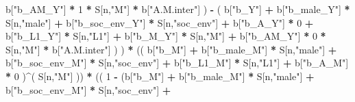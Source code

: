 \documentclass[
]{book}
\newenvironment{Shaded}{\begin{snugshade}}{\end{snugshade}}
\newcommand{\DecValTok}[1]{\textcolor[rgb]{0.00,0.00,0.81}{#1}}
\newcommand{\NormalTok}[1]{#1}
\newcommand{\SpecialCharTok}[1]{\textcolor[rgb]{0.81,0.36,0.00}{\textbf{#1}}}
\newcommand{\StringTok}[1]{\textcolor[rgb]{0.31,0.60,0.02}{#1}}
\begin{document}
\begin{Shaded}
\begin{Highlighting}[]
\NormalTok{                             b[}\StringTok{"b\_AM\_Y"}\NormalTok{] }\SpecialCharTok{*} \DecValTok{1} \SpecialCharTok{*}\NormalTok{ S[n,}\StringTok{"M"}\NormalTok{] }\SpecialCharTok{*}\NormalTok{ b[}\StringTok{"A.M.inter"}\NormalTok{] ) }\SpecialCharTok{{-}} 
\NormalTok{                           ( b[}\StringTok{"b\_Y"}\NormalTok{] }\SpecialCharTok{+} 
\NormalTok{                               b[}\StringTok{"b\_male\_Y"}\NormalTok{] }\SpecialCharTok{*}\NormalTok{ S[n,}\StringTok{"male"}\NormalTok{] }\SpecialCharTok{+} 
\NormalTok{                               b[}\StringTok{"b\_soc\_env\_Y"}\NormalTok{] }\SpecialCharTok{*}\NormalTok{ S[n,}\StringTok{"soc\_env"}\NormalTok{] }\SpecialCharTok{+} 
\NormalTok{                               b[}\StringTok{"b\_A\_Y"}\NormalTok{] }\SpecialCharTok{*} \DecValTok{0} \SpecialCharTok{+} 
\NormalTok{                               b[}\StringTok{"b\_L1\_Y"}\NormalTok{] }\SpecialCharTok{*}\NormalTok{ S[n,}\StringTok{"L1"}\NormalTok{] }\SpecialCharTok{+}
\NormalTok{                               b[}\StringTok{"b\_M\_Y"}\NormalTok{] }\SpecialCharTok{*}\NormalTok{ S[n,}\StringTok{"M"}\NormalTok{] }\SpecialCharTok{+} 
\NormalTok{                               b[}\StringTok{"b\_AM\_Y"}\NormalTok{] }\SpecialCharTok{*} \DecValTok{0} \SpecialCharTok{*}\NormalTok{ S[n,}\StringTok{"M"}\NormalTok{] }\SpecialCharTok{*}\NormalTok{ b[}\StringTok{"A.M.inter"}\NormalTok{] ) ) }\SpecialCharTok{*}
\NormalTok{      (( b[}\StringTok{"b\_M"}\NormalTok{] }\SpecialCharTok{+} 
\NormalTok{           b[}\StringTok{"b\_male\_M"}\NormalTok{] }\SpecialCharTok{*}\NormalTok{ S[n,}\StringTok{"male"}\NormalTok{] }\SpecialCharTok{+} 
\NormalTok{           b[}\StringTok{"b\_soc\_env\_M"}\NormalTok{] }\SpecialCharTok{*}\NormalTok{ S[n,}\StringTok{"soc\_env"}\NormalTok{] }\SpecialCharTok{+} 
\NormalTok{           b[}\StringTok{"b\_L1\_M"}\NormalTok{] }\SpecialCharTok{*}\NormalTok{ S[n,}\StringTok{"L1"}\NormalTok{] }\SpecialCharTok{+}
\NormalTok{           b[}\StringTok{"b\_A\_M"}\NormalTok{] }\SpecialCharTok{*} \DecValTok{0}\NormalTok{ )}\SpecialCharTok{\^{}}\NormalTok{( S[n,}\StringTok{"M"}\NormalTok{] )) }\SpecialCharTok{*} 
\NormalTok{      (( }\DecValTok{1} \SpecialCharTok{{-}}\NormalTok{ (b[}\StringTok{"b\_M"}\NormalTok{] }\SpecialCharTok{+} 
\NormalTok{                b[}\StringTok{"b\_male\_M"}\NormalTok{] }\SpecialCharTok{*}\NormalTok{ S[n,}\StringTok{"male"}\NormalTok{] }\SpecialCharTok{+} 
\NormalTok{                b[}\StringTok{"b\_soc\_env\_M"}\NormalTok{] }\SpecialCharTok{*}\NormalTok{ S[n,}\StringTok{"soc\_env"}\NormalTok{] }\SpecialCharTok{+} 

\end{Highlighting}
\end{Shaded}
\end{document}
